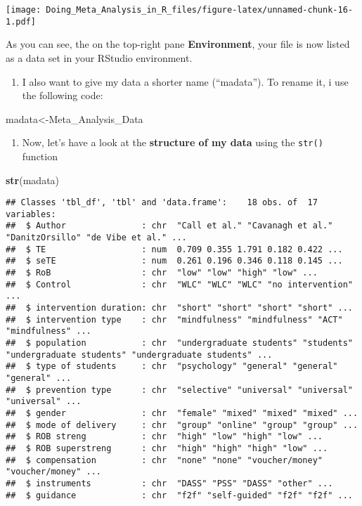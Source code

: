\documentclass[]{book}
\newenvironment{Shaded}{\begin{snugshade}}{\end{snugshade}}
\newcommand{\KeywordTok}[1]{\textcolor[rgb]{0.13,0.29,0.53}{\textbf{#1}}}
\newcommand{\NormalTok}[1]{#1}
\providecommand{\tightlist}{%
  \setlength{\itemsep}{0pt}\setlength{\parskip}{0pt}}
\theoremstyle{definition}
\theoremstyle{definition}
\theoremstyle{definition}
\theoremstyle{remark}
\begin{document}
\texttt{[image: Doing\_Meta\_Analysis\_in\_R\_files/figure-latex/unnamed-chunk-16-1.pdf]}

As you can see, the on the top-right pane \textbf{Environment}, your
file is now listed as a data set in your RStudio environment.

\begin{enumerate}
\def\labelenumi{\arabic{enumi}.}
\setcounter{enumi}{2}
\tightlist
\item
  I also want to give my data a shorter name (``madata''). To rename it,
  i use the following code:
\end{enumerate}

\begin{Shaded}
\begin{Highlighting}[]
\NormalTok{madata<-Meta_Analysis_Data}
\end{Highlighting}
\end{Shaded}

\begin{enumerate}
\def\labelenumi{\arabic{enumi}.}
\setcounter{enumi}{3}
\tightlist
\item
  Now, let's have a look at the \textbf{structure of my data} using the
  \texttt{str()} function
\end{enumerate}

\begin{Shaded}
\begin{Highlighting}[]
\KeywordTok{str}\NormalTok{(madata)}
\end{Highlighting}
\end{Shaded}

\begin{verbatim}
## Classes 'tbl_df', 'tbl' and 'data.frame':    18 obs. of  17 variables:
##  $ Author               : chr  "Call et al." "Cavanagh et al." "DanitzOrsillo" "de Vibe et al." ...
##  $ TE                   : num  0.709 0.355 1.791 0.182 0.422 ...
##  $ seTE                 : num  0.261 0.196 0.346 0.118 0.145 ...
##  $ RoB                  : chr  "low" "low" "high" "low" ...
##  $ Control              : chr  "WLC" "WLC" "WLC" "no intervention" ...
##  $ intervention duration: chr  "short" "short" "short" "short" ...
##  $ intervention type    : chr  "mindfulness" "mindfulness" "ACT" "mindfulness" ...
##  $ population           : chr  "undergraduate students" "students" "undergraduate students" "undergraduate students" ...
##  $ type of students     : chr  "psychology" "general" "general" "general" ...
##  $ prevention type      : chr  "selective" "universal" "universal" "universal" ...
##  $ gender               : chr  "female" "mixed" "mixed" "mixed" ...
##  $ mode of delivery     : chr  "group" "online" "group" "group" ...
##  $ ROB streng           : chr  "high" "low" "high" "low" ...
##  $ ROB superstreng      : chr  "high" "high" "high" "low" ...
##  $ compensation         : chr  "none" "none" "voucher/money" "voucher/money" ...
##  $ instruments          : chr  "DASS" "PSS" "DASS" "other" ...
##  $ guidance             : chr  "f2f" "self-guided" "f2f" "f2f" ...
\end{verbatim}
\end{document}
